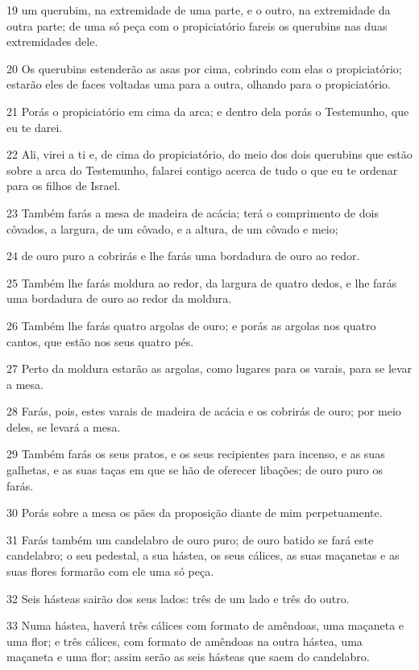 \par 19 um querubim, na extremidade de uma parte, e o outro, na extremidade da outra parte; de uma só peça com o propiciatório fareis os querubins nas duas extremidades dele.
\par 20 Os querubins estenderão as asas por cima, cobrindo com elas o propiciatório; estarão eles de faces voltadas uma para a outra, olhando para o propiciatório.
\par 21 Porás o propiciatório em cima da arca; e dentro dela porás o Testemunho, que eu te darei.
\par 22 Ali, virei a ti e, de cima do propiciatório, do meio dos dois querubins que estão sobre a arca do Testemunho, falarei contigo acerca de tudo o que eu te ordenar para os filhos de Israel.
\par 23 Também farás a mesa de madeira de acácia; terá o comprimento de dois côvados, a largura, de um côvado, e a altura, de um côvado e meio;
\par 24 de ouro puro a cobrirás e lhe farás uma bordadura de ouro ao redor.
\par 25 Também lhe farás moldura ao redor, da largura de quatro dedos, e lhe farás uma bordadura de ouro ao redor da moldura.
\par 26 Também lhe farás quatro argolas de ouro; e porás as argolas nos quatro cantos, que estão nos seus quatro pés.
\par 27 Perto da moldura estarão as argolas, como lugares para os varais, para se levar a mesa.
\par 28 Farás, pois, estes varais de madeira de acácia e os cobrirás de ouro; por meio deles, se levará a mesa.
\par 29 Também farás os seus pratos, e os seus recipientes para incenso, e as suas galhetas, e as suas taças em que se hão de oferecer libações; de ouro puro os farás.
\par 30 Porás sobre a mesa os pães da proposição diante de mim perpetuamente.
\par 31 Farás também um candelabro de ouro puro; de ouro batido se fará este candelabro; o seu pedestal, a sua hástea, os seus cálices, as suas maçanetas e as suas flores formarão com ele uma só peça.
\par 32 Seis hásteas sairão dos seus lados: três de um lado e três do outro.
\par 33 Numa hástea, haverá três cálices com formato de amêndoas, uma maçaneta e uma flor; e três cálices, com formato de amêndoas na outra hástea, uma maçaneta e uma flor; assim serão as seis hásteas que saem do candelabro.
